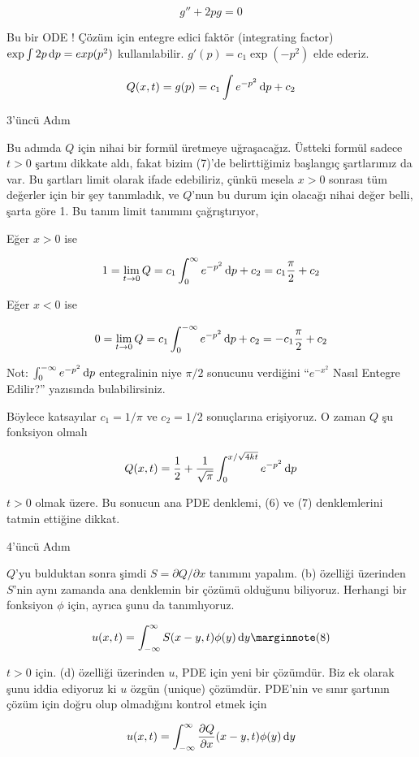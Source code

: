 \documentclass[12pt,fleqn]{article}\usepackage{../../common}
\begin{document}
$$ g'' + 2pg = 0 $$

Bu bir ODE ! Çözüm için entegre edici faktör (integrating factor) $\exp \int 2p
\,\mathrm{d} p = exp(p^2)$ kullanılabilir. $g'(p) = c_1 \exp(-p^2)$ elde ederiz.

$$ Q(x,t) = g(p) = c_1 \int e^{-p^2} \,\mathrm{d} p + c_2 $$

3'üncü Adım 

Bu adımda $Q$ için nihai bir formül üretmeye uğraşacağız. Üstteki formül
sadece $t>0$ şartını dikkate aldı, fakat bizim (7)'de belirttiğimiz
başlangıç şartlarımız da var. Bu şartları limit olarak ifade edebiliriz,
çünkü mesela $x>0$ sonrası tüm değerler için bir şey tanımladık, ve $Q$'nun bu
durum için olacağı nihai değer belli, şarta göre 1. Bu tanım limit tanımını
çağrıştırıyor, 

Eğer $x>0$ ise

$$ 1 = \lim_{t \to 0} Q = 
 c_1 \int_0^{\infty} e^{-p^2} \,\mathrm{d} p + c_2 = 
c_1 \frac{\pi}{2} + c_2
 $$

Eğer $x<0$ ise

$$
0 = \lim_{t \to 0} Q = 
 c_1 \int_0^{-\infty} e^{-p^2} \,\mathrm{d} p + c_2 = 
-c_1 \frac{\pi}{2} + c_2
 $$

Not: $\int_0^{-\infty} e^{-p^2} \,\mathrm{d} p$ entegralinin niye $\pi/2$ sonucunu
verdiğini ``$e^{-x^2}$ Nasıl Entegre Edilir?'' yazısında bulabilirsiniz.

Böylece katsayılar $c_1 = 1/\pi$ ve $c_2 = 1/2$ sonuçlarına erişiyoruz. O
zaman $Q$ şu fonksiyon olmalı

$$
Q(x,t) = 
\frac{1}{2} + \frac{ 1}{\sqrt{\pi}} \int_{0}^{x/\sqrt{4kt}} e^{-p^2} \,\mathrm{d} p
$$

$t>0$ olmak üzere. Bu sonucun ana PDE denklemi, (6) ve (7) denklemlerini
tatmin ettiğine dikkat. 

4'üncü Adım

$Q$'yu bulduktan sonra şimdi $S = \partial Q/\partial x$ tanımını
yapalım. (b) özelliği üzerinden $S$'nin aynı zamanda ana denklemin bir
çözümü olduğunu biliyoruz. Herhangi bir fonksiyon $\phi$ için, ayrıca şunu
da tanımlıyoruz. 

$$
u(x,t) = \int_{-\infty}^{\infty} S(x-y,t) \phi(y) \ud y  \mlabel{8}
$$

$t>0$ için. (d) özelliği üzerinden $u$, PDE için yeni bir çözümdür. Biz ek
olarak şunu iddia ediyoruz ki $u$ özgün (unique) çözümdür. PDE'nin ve
sınır şartının çözüm için doğru olup olmadığını kontrol etmek için 

$$
u(x,t) = \int_{-\infty}^{\infty} 
\frac{\partial Q}{\partial x}(x-y,t)\phi(y) \,\mathrm{d} y
$$
\end{document}
